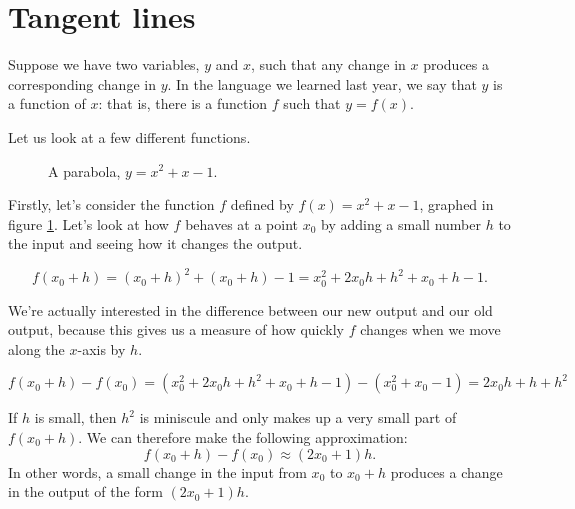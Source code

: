 \section{Tangent lines}
Suppose we have two variables, $ y $ and $ x $, such that any change in $ x $ produces
a corresponding change in $ y $. In the language we learned last year, we say that $ y $
is a function of $ x $: that is, there is a function $ f $ such that $ y = f(x) $.

Let us look at a few different functions.

\begin{figure}\centering
  \caption{A parabola, $ y = x^2 + x - 1 $.\label{fig:func1}}
\end{figure}

Firstly, let's consider the function $ f $ defined by $ f(x) = x^2 + x - 1 $, graphed in figure \ref{fig:func1}. Let's
look at how $ f $ behaves at a point $ x_0 $ by adding a small number $ h $ to the input and seeing how it changes
the output.

\begin{displaymath}
  f(x_0 + h) = (x_0 + h)^2 + (x_0 + h) - 1 = x_0^2 + 2x_0 h + h^2 + x_0 + h - 1.
\end{displaymath}

We're actually interested in the difference between our new output and our old output, because this gives us
a measure of how quickly $ f $ changes when we move along the $ x$-axis by $ h $.

\begin{displaymath}
  f(x_0 + h) - f(x_0) = (x_0^2 + 2x_0 h + h^2 + x_0 + h - 1) - (x_0^2 + x_0 - 1) = 2x_0 h + h + h^2
\end{displaymath}

If $ h $ is small, then $ h^2 $ is miniscule and only makes up a very small part of $ f(x_0 + h) $. We can therefore
make the following approximation:
\begin{displaymath}
  f(x_0 + h) - f(x_0) \approx (2x_0 + 1)h.
\end{displaymath}
In other words, a small change in the input from $ x_0 $ to $ x_0 + h $ produces a change in the output of the form $ (2x_0 + 1)h $.

